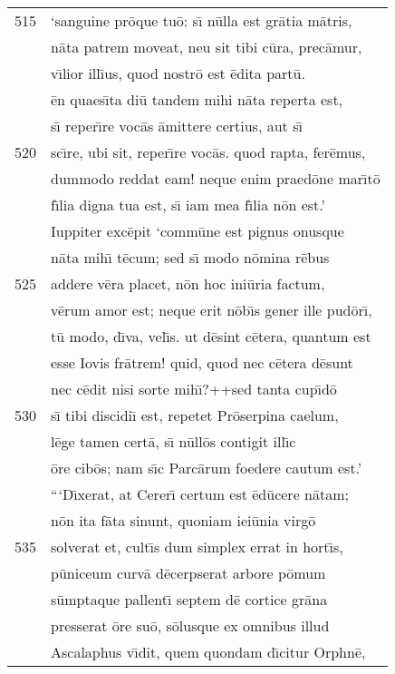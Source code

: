 \documentclass[paper=6in:9in,pagesize=pdftex,
               headinclude=on,footinclude=on,12pt]{scrbook}
\begin{document}
\begin{longtable}[p]{ r l }
515 & `sanguine pr\=oque tu\=o: s\={\i} n\=ulla est gr\=atia m\=atris,\\ 
 & n\=ata patrem moveat, neu sit tibi c\=ura, prec\=amur,\\ 
 & v\={\i}lior ill\={\i}us, quod nostr\=o est \=edita part\=u.\\ 
 & \=en quaes\={\i}ta di\=u tandem mihi n\=ata reperta est,\\ 
 & s\={\i} reper\={\i}re voc\=as \=amittere certius, aut s\={\i}\\ 
520 & sc\={\i}re, ubi sit, reper\={\i}re voc\=as. quod rapta, fer\=emus,\\ 
 & dummodo reddat eam! neque enim praed\=one mar\={\i}t\=o\\ 
 & f\={\i}lia digna tua est, s\={\i} iam mea f\={\i}lia n\=on est.'\\ 
 & Iuppiter exc\=epit `comm\=une est pignus onusque\\ 
 & n\=ata mih\={\i} t\=ecum; sed s\={\i} modo n\=omina r\=ebus\\ 
525 & addere v\=era placet, n\=on hoc ini\=uria factum,\\ 
 & v\=erum amor est; neque erit n\=ob\={\i}s gener ille pud\=or\={\i},\\ 
 & t\=u modo, d\={\i}va, vel\={\i}s. ut d\=esint c\=etera, quantum est\\ 
 & esse Iovis fr\=atrem! quid, quod nec c\=etera d\=esunt\\ 
 & nec c\=edit nisi sorte mih\={\i}?++sed tanta cup\={\i}d\=o\\ 
530 & s\={\i} tibi discidi\={\i} est, repetet Pr\=oserpina caelum,\\ 
 & l\=ege tamen cert\=a, s\={\i} n\=ull\=os contigit ill\={\i}c\\ 
 & \=ore cib\=os; nam s\={\i}c Parc\=arum foedere cautum est.'\\ 
 & \indent ```D\={\i}xerat, at Cerer\={\i} certum est \=ed\=ucere n\=atam;\\ 
 & n\=on ita f\=ata sinunt, quoniam iei\=unia virg\=o\\ 
535 & solverat et, cult\={\i}s dum simplex errat in hort\={\i}s,\\ 
 & p\=uniceum curv\=a d\=ecerpserat arbore p\=omum\\ 
 & s\=umptaque pallent\={\i} septem d\=e cortice gr\=ana\\ 
 & presserat \=ore su\=o, s\=olusque ex omnibus illud\\ 
 & Ascalaphus v\={\i}dit, quem quondam d\={\i}citur Orphn\=e,\\ 

\end{longtable}
\end{document}
